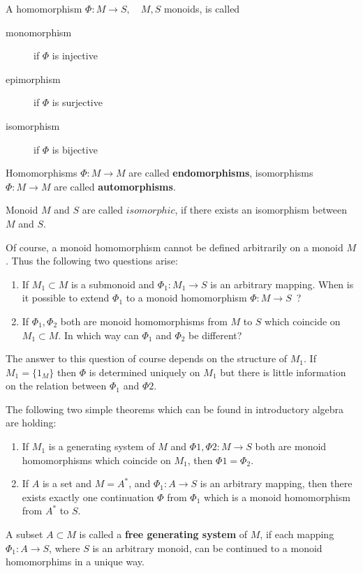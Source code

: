 A homomorphism $\Phi : M \to S, \quad M,S$ monoids, is called
\begin{description}
  \item[monomorphism] if $\Phi$ is injective
  \item[epimorphism] if $\Phi$ is surjective
  \item[isomorphism] if $\Phi$ is bijective
\end{description}

Homomorphisms $\Phi : M \to M$ are called {\bf endomorphisms}, isomorphisms
$\Phi : M \to M$ are called {\bf automorphisms}.

Monoid $M$ and $S$ are called $isomorphic$, if there exists an isomorphism
between $M$ and $S$.

Of course, a monoid homomorphism cannot be defined arbitrarily on a monoid $M$.
Thus the following two questions arise:
\begin{enumerate}
  \item If $M_1 \subset M$ is a submonoid and $\Phi_1 : M_1 \to S$ is an arbitrary
mapping. When is it possible to extend $\Phi_1$ to a monoid homomorphism $\Phi
: M \to S$\ ?
	\item If $\Phi_1, \Phi_2$ both are monoid homomorphisms from $M$ to $S$ which
	coincide on $M_1 \subset M$. In which way can $\Phi_1$ and $\Phi_2$ be
	different? 
\end{enumerate}

The answer to this question of course depends on the structure of $M_1$. If
$M_1 = \{ 1_M \}$ then $\Phi$ is determined uniquely on $M_1$ but there is
little information on the relation between $\Phi_1$ and $\Phi2$.

The following two simple theorems which can be found in introductory algebra are
holding:
\begin{enumerate}
  \item If $M_1$ is a generating system of $M$ and $\Phi1, \Phi2 : M \to S$ both
  are monoid homomorphisms which coincide on $M_1$, then $\Phi1 = \Phi_2$.
  \item If $A$ is a set and $M = A^*$, and $\Phi_1 : A \to S$ is an arbitrary
  mapping, then there exists exactly one continuation $\Phi$ from $\Phi_1$ which
  is a monoid homomorphism from $A^*$ to $S$.
\end{enumerate}

\begin{definition}
A subset $A \subset M$ is called a {\bf free generating system} of $M$, if each
mapping $\Phi_1 : A \to S$, where $S$ is an arbitrary monoid, can be continued
to a monoid homomorphims in a unique way.
\end{definition}

